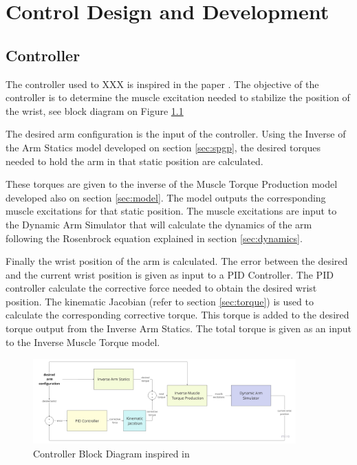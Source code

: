 \chapter{Control Design and Development}



\section{Controller}
The controller used to XXX is inspired in the paper \cite{QSC}. The objective of the controller is to determine the muscle excitation needed to stabilize the position of the wrist, see block diagram on Figure \ref{fig:BDC}

The desired arm configuration is the input of the controller. Using the Inverse of the Arm Statics model developed on section \ref{sec:spgp}, the desired torques needed to hold the arm in that static position are calculated. 

These torques are given to the inverse of the Muscle Torque Production model developed also on section \ref{sec:model}. The model outputs the corresponding muscle excitations for that static position. The muscle excitations are input to the Dynamic Arm Simulator that will calculate the dynamics of the arm following the Rosenbrock equation explained in section \ref{sec:dynamics}.

Finally the wrist position of the arm is calculated. The error between the desired and the current wrist position is given as input to a PID Controller. The PID controller calculate the corrective force needed to obtain the desired wrist position. The kinematic Jacobian (refer to section \ref{sec:torque}) is used to calculate the corresponding corrective torque. This torque is added to the desired torque output from the Inverse Arm Statics. The total torque is given as an input to the Inverse Muscle Torque model.

\begin{figure}[h!]
    \centering
    \includegraphics[width=0.9\textwidth]{Pictures/Controller/controller-diagram.jpg}
    \caption{Controller Block Diagram inspired in \cite{QSC}}
    \label{fig:BDC}
\end{figure}

